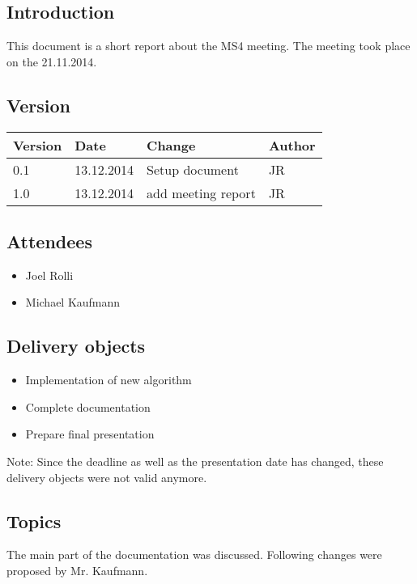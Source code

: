 \subsection{Introduction}

This document is a short report about the MS4 meeting. The meeting took place on the 21.11.2014.

\subsection{Version}


\begin{tabular}{| p{1.5cm} | p{2cm} | p{9cm} | p{1.5cm} |}
    \hline
    Version 	& Date      		& Change & Author 								\\ \hline
    0.1    		& 13.12.2014        & Setup document        				& JR 	\\ \hline
    1.0 		& 13.12.2014 		& add meeting report 					& JR 	\\ \hline
\end{tabular}


\subsection{Attendees}
\begin{itemize}
\item Joel Rolli
\item Michael Kaufmann
\end{itemize}

\subsection{Delivery objects}

\begin{itemize}
    \item Implementation of new algorithm
    \item Complete documentation
    \item Prepare final presentation
\end{itemize}

Note: Since the deadline as well as the presentation date has changed, these delivery objects were not valid anymore.

\subsection{Topics}

The main part of the documentation was discussed. Following changes were proposed by Mr. Kaufmann.

